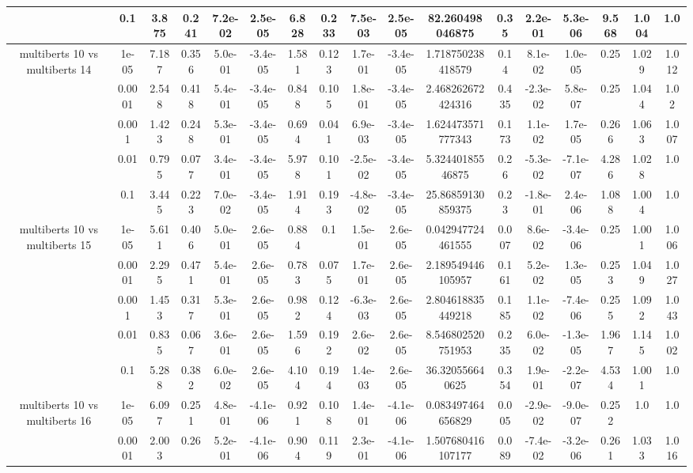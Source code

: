 \begin{tabular}{|c|c|c|c|c|c|c|c|c|c|c|c|c|c|c|c|c|}
 & 0.1 & 3.875 & 0.241 & 7.2e-02 & 2.5e-05 & 6.828 & 0.233 & 7.5e-03 & 2.5e-05 & 82.260498046875 & 0.35 & 2.2e-01 & 5.3e-06 & 9.568 & 1.004 & 1.0 \\
\hline
\multirow{5}{*}{multiberts 10 vs multiberts 14} & 1e-05 & 7.187 & 0.356 & 5.0e-01 & -3.4e-05 & 1.581 & 0.123 & 1.7e-01 & -3.4e-05 & 1.718750238418579 & 0.14 & 8.1e-02 & 1.0e-05 & 0.25 & 1.029 & 1.012 \\
 & 0.0001 & 2.548 & 0.418 & 5.4e-01 & -3.4e-05 & 0.848 & 0.105 & 1.8e-01 & -3.4e-05 & 2.468262672424316 & 0.435 & -2.3e-02 & 5.8e-07 & 0.25 & 1.044 & 1.02 \\
 & 0.001 & 1.423 & 0.248 & 5.3e-01 & -3.4e-05 & 0.694 & 0.041 & 6.9e-03 & -3.4e-05 & 1.624473571777343 & 0.173 & 1.1e-02 & 1.7e-05 & 0.266 & 1.063 & 1.007 \\
 & 0.01 & 0.795 & 0.077 & 3.4e-01 & -3.4e-05 & 5.978 & 0.101 & -2.5e-02 & -3.4e-05 & 5.32440185546875 & 0.26 & -5.3e-02 & -7.1e-07 & 4.286 & 1.028 & 1.0 \\
 & 0.1 & 3.445 & 0.223 & 7.0e-02 & -3.4e-05 & 1.914 & 0.193 & -4.8e-02 & -3.4e-05 & 25.86859130859375 & 0.23 & -1.8e-01 & 2.4e-06 & 1.088 & 1.004 & 1.0 \\
\hline
\multirow{5}{*}{multiberts 10 vs multiberts 15} & 1e-05 & 5.611 & 0.406 & 5.0e-01 & 2.6e-05 & 0.884 & 0.1 & 1.5e-01 & 2.6e-05 & 0.042947724461555 & 0.007 & 8.6e-02 & -3.4e-06 & 0.25 & 1.001 & 1.006 \\
 & 0.0001 & 2.295 & 0.471 & 5.4e-01 & 2.6e-05 & 0.783 & 0.075 & 1.7e-01 & 2.6e-05 & 2.189549446105957 & 0.161 & 5.2e-02 & 1.3e-05 & 0.253 & 1.049 & 1.027 \\
 & 0.001 & 1.453 & 0.317 & 5.3e-01 & 2.6e-05 & 0.982 & 0.124 & -6.3e-03 & 2.6e-05 & 2.804618835449218 & 0.185 & 1.1e-02 & -7.4e-06 & 0.255 & 1.092 & 1.043 \\
 & 0.01 & 0.835 & 0.067 & 3.6e-01 & 2.6e-05 & 1.596 & 0.192 & 2.6e-02 & 2.6e-05 & 8.546802520751953 & 0.235 & 6.0e-02 & -1.3e-05 & 1.967 & 1.145 & 1.002 \\
 & 0.1 & 5.288 & 0.382 & 6.0e-02 & 2.6e-05 & 4.104 & 0.194 & 1.4e-03 & 2.6e-05 & 36.320556640625 & 0.354 & 1.9e-01 & -2.2e-07 & 4.534 & 1.001 & 1.0 \\
\hline
\multirow{5}{*}{multiberts 10 vs multiberts 16} & 1e-05 & 6.097 & 0.251 & 4.8e-01 & -4.1e-06 & 0.921 & 0.108 & 1.4e-01 & -4.1e-06 & 0.083497464656829 & 0.005 & -2.9e-02 & -9.0e-07 & 0.252 & 1.0 & 1.0 \\
 & 0.0001 & 2.003 & 0.26 & 5.2e-01 & -4.1e-06 & 0.904 & 0.119 & 2.3e-01 & -4.1e-06 & 1.507680416107177 & 0.089 & -7.4e-02 & -3.2e-06 & 0.261 & 1.033 & 1.016 \\

\end{tabular}

